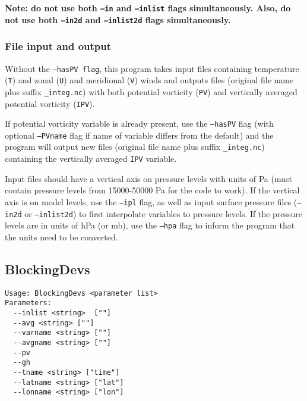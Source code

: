 \documentclass{article}
\begin{document}
\textbf{Note: do not use both \texttt{--in} and \texttt{--inlist} flags simultaneously. Also, do not use both \texttt{--in2d} and \texttt{--inlist2d} flags simultaneously.}

\subsubsection{File input and output}


Without the \texttt{--hasPV flag}, this program takes input files containing temperature (\texttt{T}) and zonal (\texttt{U}) and meridional (\texttt{V}) winds and outputs files  (original file name plus suffix \texttt{\_integ.nc}) with both potential vorticity (\texttt{PV}) and vertically averaged potential vorticity (\texttt{IPV}). 


If potential vorticity variable is already present,  use the \texttt{--hasPV} flag (with optional \texttt{--PVname} flag if name of variable differs from the default) and the program will output new files (original file name plus suffix \texttt{\_integ.nc}) containing the vertically averaged \texttt{IPV} variable.

Input files should have a vertical axis on pressure levels with units of Pa (must contain pressure levels from 15000-50000 Pa for the code to work). If the vertical axis is on model levels, use the \texttt{--ipl} flag, as well as input surface pressure files (\texttt{--in2d} or \texttt{--inlist2d}) to first interpolate variables to pressure levels. If the pressure levels are in units of hPa (or mb), use the \texttt{--hpa} flag to inform the program that the units need to be converted.

\subsection{BlockingDevs}\label{dev}
\begin{verbatim}
Usage: BlockingDevs <parameter list>
Parameters:
  --inlist <string>  [""]
  --avg <string> [""]
  --varname <string> [""]
  --avgname <string> [""]
  --pv
  --gh
  --tname <string> ["time"]
  --latname <string> ["lat"]
  --lonname <string> ["lon"]
\end{verbatim}
\end{document}

